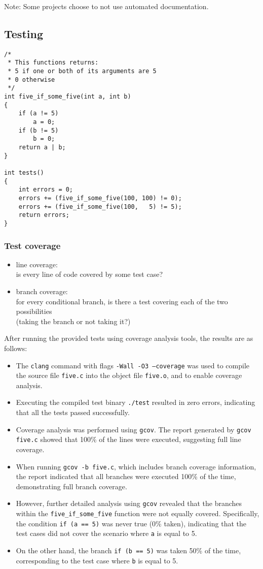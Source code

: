 \documentclass[12pt]{article}
\begin{document}
Note: Some projects choose to not use automated documentation.

\subsection{Testing}
\begin{lstlisting}
/*
 * This functions returns:
 * 5 if one or both of its arguments are 5
 * 0 otherwise
 */
int five_if_some_five(int a, int b)
{
    if (a != 5)
        a = 0;
    if (b != 5)
        b = 0;
    return a | b;
}

int tests()
{
    int errors = 0;
    errors += (five_if_some_five(100, 100) != 0);
    errors += (five_if_some_five(100,   5) != 5);
    return errors;
}
\end{lstlisting}

\subsubsection{Test coverage}
\begin{itemize}
    \item line coverage: \\
    is every line of code covered by some test case?
    \item branch coverage: \\
    for every conditional branch, is there a test covering each of the two possibilities \\
    (taking the branch or not taking it?)
\end{itemize}

After running the provided tests using coverage analysis tools, the results are as follows:

\begin{itemize}
    \item The \texttt{clang} command with flags \texttt{-Wall -O3 --coverage} was used to compile the source file \texttt{five.c} into the object file \texttt{five.o}, and to enable coverage analysis.
    \item Executing the compiled test binary \texttt{./test} resulted in zero errors, indicating that all the tests passed successfully.
    \item Coverage analysis was performed using \texttt{gcov}. The report generated by \texttt{gcov five.c} showed that 100\% of the lines were executed, suggesting full line coverage.
    \item When running \texttt{gcov -b five.c}, which includes branch coverage information, the report indicated that all branches were executed 100\% of the time, demonstrating full branch coverage.
    \item However, further detailed analysis using \texttt{gcov} revealed that the branches within the \texttt{five\_if\_some\_five} function were not equally covered. Specifically, the condition \texttt{if (a == 5)} was never true (0\% taken), indicating that the test cases did not cover the scenario where \texttt{a} is equal to 5.
    \item On the other hand, the branch \texttt{if (b == 5)} was taken 50\% of the time, corresponding to the test case where \texttt{b} is equal to 5.
\end{itemize}
\end{document}
